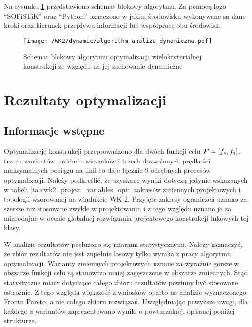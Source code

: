 Na rysunku \ref{fig:wk2_dynamic_algorithm} przedstawiono schemat blokowy algorytmu. Za pomocą logo \enquote{SOFiSTiK} oraz \enquote{Python} oznaczono w jakim środowisku wykonywane są dane kroki oraz kierunek przepływu informacji lub współpracę obu środowisk.
\begin{figure}[hbt!]
	\centering
	\texttt{[image: /WK2/dynamic/algorithm\_analiza\_dynamiczna.pdf]} 
	\captionsetup{justification=centering}
	\caption{Schemat blokowy algorytmu optymalizacji wielokryterialnej konstrukcji ze względu na jej zachowanie dynamiczne}
	\label{fig:wk2_dynamic_algorithm}
\end{figure}
\clearpage
\section{Rezultaty optymalizacji}
\subsection{Informacje wstępne}
Optymalizację konstrukcji przeprowadzono dla dwóch funkcji celu $\bm{F}=[f_s,f_a]$, trzech wariantów rozkładu wieszaków i trzech dozwolonych prędkości maksymalnych pociągu na linii co daje łącznie 9 odrębnych procesów optymalizacji. Należy podkreślić, że uzyskane wyniki dotyczą jedynie wskazanych w tabeli \ref{tab:wk2_project_variables_opti} zakresów zmiennych projektowych i topologii wzorowanej na wiadukcie WK-2. Przyjęte zakresy ograniczeń uznano za szersze niż stosowane zwykle w projektowaniu i z tego względu uznano je za miarodajne w ocenie globalnej rozwiązania projektowego konstrukcji łukowych tej klasy. 

W analizie rezultatów posłużono się miarami statystycznymi. Należy zaznaczyć, że zbiór rezultatów nie jest zupełnie losowy tylko wynika z pracy algorytmu optymalizacji. Warianty zmiennych projektowych uznane za wyraźnie gorsze w obszarze funkcji celu są stanowczo mniej zagęszczone w obszarze zmiennych. Stąd statystyczne miary dotyczące całego zbioru rezultatów powinny być stosowane ostrożnie. Z tego względu większość z wniosków oparto na analizie wyznaczonego Frontu Pareto, a nie całego zbioru rozwiązań. Uwzględniając powyższe uwagi, dla każdego z wariantów zaprezentowano wyniki o powtarzalnej, opisanej poniżej strukturze.

